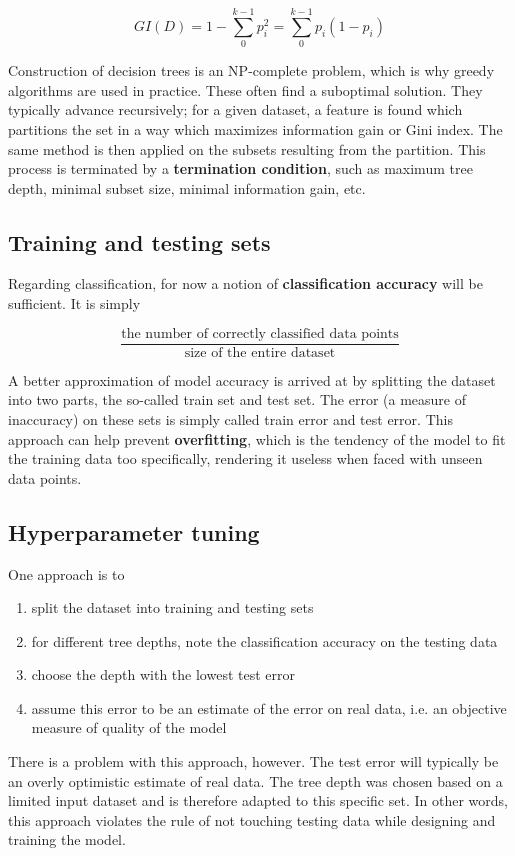 \documentclass[a4paper]{article}
\begin{document}
	$$GI(D) = 1 - \sum_0^{k - 1} p_i^2 = \sum_0^{k - 1} p_i (1 - p_i)$$

	Construction of decision trees is an NP-complete problem, which is why greedy
	algorithms are used in practice. These often find a suboptimal solution. They
	typically advance recursively; for a given dataset, a feature is found which
	partitions the set in a way which maximizes information gain or Gini index.
	The same method is then applied on the subsets resulting from the partition.
	This process is terminated by a \textbf{termination condition}, such as
	maximum tree depth, minimal subset size, minimal information gain, etc.

	\subsection{Training and testing sets}
	Regarding classification, for now a notion of \textbf{classification accuracy} will be sufficient.
	It is simply

	$$\frac{\text{the number of correctly classified data points}}{\text{size of the entire dataset}}$$

	A better approximation of model accuracy is arrived at by splitting the dataset into two parts,
	the so-called train set and test set. The error (a measure of inaccuracy) on these sets is
	simply called train error and test error. This approach can help prevent \textbf{overfitting},
	which is the tendency of the model to fit the training data too specifically, rendering it
	useless when faced with unseen data points.

	\subsection{Hyperparameter tuning}
	One approach is to
	\begin{enumerate}
		\item split the dataset into training and testing sets
		\item for different tree depths, note the classification accuracy on the testing data
		\item choose the depth with the lowest test error
		\item assume this error to be an estimate of the error on real data,
			i.e. an objective measure of quality of the model
	\end{enumerate}
	There is a problem with this approach, however. The test error will typically be
	an overly optimistic estimate of real data. The tree depth was chosen based on a
	limited input dataset and is therefore adapted to this specific set. In other words,
	this approach violates the rule of not touching testing data while designing and
	training the model.
\end{document}
